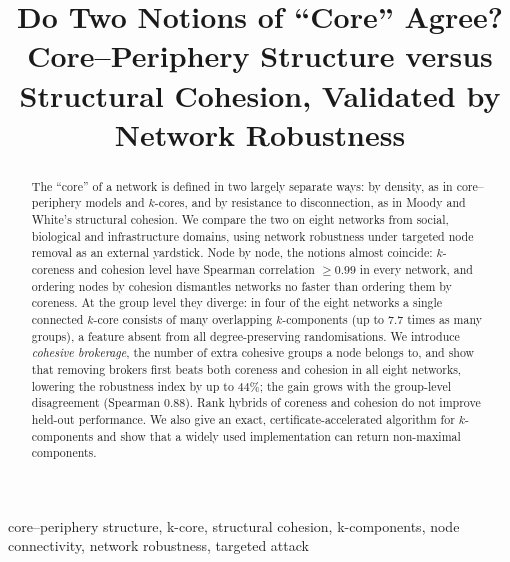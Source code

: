 \documentclass[conference]{IEEEtran}
\begin{document}
\title{Do Two Notions of ``Core'' Agree?\\
Core--Periphery Structure versus Structural Cohesion, Validated by Network Robustness}

\author{}

\maketitle

\begin{abstract}
The ``core'' of a network is defined in two largely separate ways: by density, as in core--periphery
models and $k$-cores, and by resistance to disconnection, as in Moody and White's structural cohesion.
We compare the two on eight networks from social, biological and infrastructure domains, using network
robustness under targeted node removal as an external yardstick. Node by node, the notions almost
coincide: $k$-coreness and cohesion level have Spearman correlation $\ge0.99$ in every network, and
ordering nodes by cohesion dismantles networks no faster than ordering them by coreness. At the group
level they diverge: in four of the eight networks a single connected $k$-core consists of many
overlapping $k$-components (up to $7.7$ times as many groups), a feature absent from all degree-preserving
randomisations. We introduce \emph{cohesive brokerage}, the number of extra cohesive groups a node
belongs to, and show that removing brokers first beats both coreness and cohesion in all eight networks,
lowering the robustness index by up to $44\%$; the gain grows with the group-level disagreement
(Spearman $0.88$). Rank hybrids of coreness and cohesion do not improve held-out performance. We also
give an exact, certificate-accelerated algorithm for $k$-components and show that a widely used
implementation can return non-maximal components.
\end{abstract}

\begin{IEEEkeywords}
core--periphery structure, k-core, structural cohesion, k-components, node connectivity,
network robustness, targeted attack
\end{IEEEkeywords}

\end{document}
